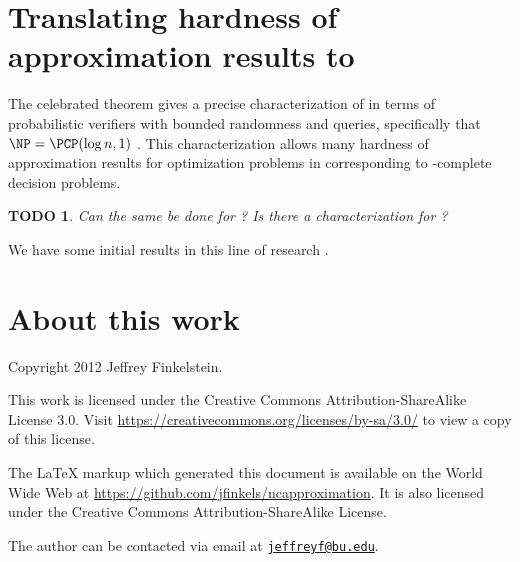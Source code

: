 \documentclass[]{article}
\theoremstyle{plain}
\newtheorem{todo}{TODO}
\theoremstyle{definition}
\newcommand{\email}[1]{\href{mailto:#1}{\nolinkurl{#1}}}
\begin{document}
\section{Translating hardness of approximation results to \texorpdfstring{\NC}{NC}}

The celebrated \PCP{} theorem gives a precise characterization of \NP{} in terms of probabilistic verifiers with bounded randomness and queries, specifically that $\NP = \PCP(\log n, 1)$ \cite{pcp}.
This characterization allows many hardness of approximation results for optimization problems in \NPO{} corresponding to \NP-complete decision problems.

\begin{todo}
  Can the same be done for \NNC?
  Is there a \PCP{} characterization for \NNC?
\end{todo}

We have some initial results in this line of research \cite{finkelstein13}.

\section{About this work}

Copyright 2012 Jef{}frey Finkelstein.

This work is licensed under the Creative Commons Attribution-ShareAlike License 3.0.
Visit \mbox{\url{https://creativecommons.org/licenses/by-sa/3.0/}} to view a copy of this license.

The \LaTeX{} markup which generated this document is available on the World Wide Web at \mbox{\url{https://github.com/jfinkels/ncapproximation}}.
It is also licensed under the Creative Commons Attribution-ShareAlike License.

The author can be contacted via email at \email{jeffreyf@bu.edu}.



\end{document}
